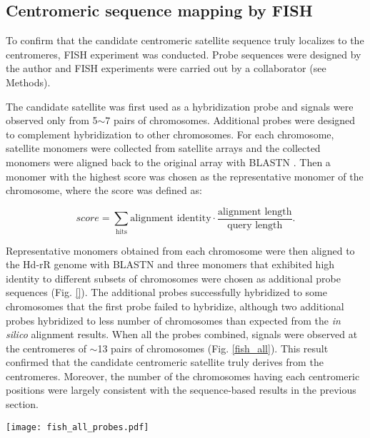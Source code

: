 

\subsection*{Centromeric sequence mapping by FISH}
  To confirm that the candidate centromeric satellite sequence truly localizes to the centromeres, FISH experiment was conducted. Probe sequences were designed by the author and FISH experiments were carried out by a collaborator (see Methods).

  The candidate satellite was first used as a hybridization probe and signals were observed only from 5$\sim$7 pairs of chromosomes. Additional probes were designed to complement hybridization to other chromosomes. For each chromosome, satellite monomers were collected from satellite arrays and the collected monomers were aligned back to the original array with BLASTN \cite{Camacho2009}. Then a monomer with the highest score was chosen as the representative monomer of the chromosome, where the score was defined as:

  \[
    score = \sum_{\mbox{hits}} \mbox{alignment identity} \cdot \frac{\mbox{alignment length}}{\mbox{query length}}.
  \]

  Representative monomers obtained from each chromosome were then aligned to the Hd-rR genome with BLASTN and three monomers that exhibited high identity to different subsets of chromosomes were chosen as additional probe sequences (Fig. \ref{}). The additional probes successfully hybridized to some chromosomes that the first probe failed to hybridize, although two additional probes hybridized to less number of chromosomes than expected from the \textit{in silico} alignment results. When all the probes combined, signals were observed at the centromeres of $\sim$13 pairs of chromosomes (Fig. \ref{fish_all}). This result confirmed that the candidate centromeric satellite truly derives from the centromeres. Moreover, the number of the chromosomes having each centromeric positions were largely consistent with the sequence-based results in the previous section.

  \begin{figure*}
    \centering
    \texttt{[image: fish\_all\_probes.pdf]}
    \caption{
      The candidate centromeric satellite sequence and three derivative sequences localized to the centromeres of $\sim$13 pairs of chromosomes. (left) DNA is stained with DAPI. (center) probes are stained green. (right) two images are combined.
    }
    \label{fish_all}
  \end{figure*}


